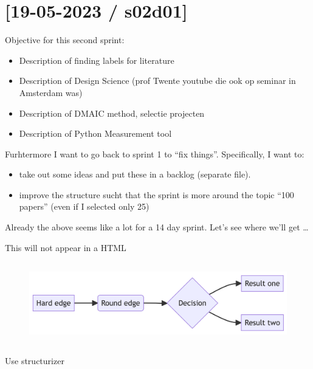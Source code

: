 \documentclass[
  letterpaper,
  DIV=11,
  numbers=noendperiod]{scrreprt}
\providecommand{\tightlist}{%
  \setlength{\itemsep}{0pt}\setlength{\parskip}{0pt}}\usepackage{longtable,booktabs,array}
\begin{document}
\hypertarget{s02d01}{%
\section{{[}19-05-2023 / s02d01{]}}\label{s02d01}}

Objective for this second sprint:

\begin{itemize}
\tightlist
\item
  Description of finding labels for literature
\item
  Description of Design Science (prof Twente youtube die ook op seminar
  in Amsterdam was)
\item
  Description of DMAIC method, selectie projecten
\item
  Description of Python Measurement tool
\end{itemize}

Furhtermore I want to go back to sprint 1 to ``fix things''.
Specifically, I want to:

\begin{itemize}
\tightlist
\item
  take out some ideas and put these in a backlog (separate file).
\item
  improve the structure sucht that the sprint is more around the topic
  ``100 papers'' (even if I selected only 25)
\end{itemize}

Already the above seems like a lot for a 14 day sprint. Let's see where
we'll get \ldots{}

This will not appear in a HTML

\begin{figure}[H]

{\centering \includegraphics[width=5.74in,height=1.4in]{s3_methods_files/figure-latex/mermaid-figure-1.png}

}

\end{figure}

Use structurizer
\end{document}
